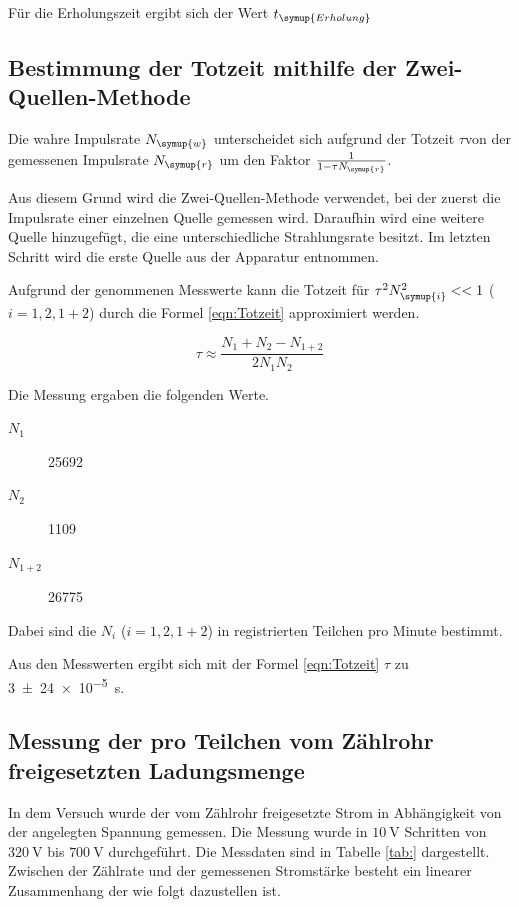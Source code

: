 Für die Erholungszeit ergibt sich der Wert $t_{\symup{Erholung}}$

\subsection{Bestimmung der Totzeit mithilfe der Zwei-Quellen-Methode}

Die wahre Impulsrate $N_{\symup{w}}$ unterscheidet sich aufgrund der Totzeit $\tau $von der
gemessenen Impulsrate $N_{\symup{r}}$ um den Faktor $\frac{1}{1-\tau N_{\symup{r}}}$.

Aus diesem Grund wird die Zwei-Quellen-Methode verwendet, bei der
zuerst die Impulsrate einer einzelnen Quelle gemessen wird.
Daraufhin wird eine weitere Quelle hinzugefügt, die eine unterschiedliche
Strahlungsrate besitzt. Im letzten Schritt wird die erste Quelle aus der
Apparatur entnommen.

Aufgrund der genommenen Messwerte kann die Totzeit für $\tau^2N_{\symup{i}}^2 << 1$
($i = 1, 2, 1+2$) durch die Formel \ref{eqn:Totzeit} approximiert werden.

\begin{equation}
  \label{eqn:Totzeit}
  \tau \approx \frac{N_1 + N_2 - N_{1+2}}{2N_1N_2}
\end{equation}

Die Messung ergaben die folgenden Werte.

\begin{description}
  \item[$N_1$] 25692
  \item[$N_2$] 1109
  \item[$N_{1+2}$] 26775
\end{description}

Dabei sind die $N_i$ ($i = 1, 2, 1+2$) in registrierten Teilchen pro Minute bestimmt.

Aus den Messwerten ergibt sich mit der Formel \ref{eqn:Totzeit}
$\tau$ zu \SI{3(24)e-5}{\second}.

\subsection{Messung der pro Teilchen vom Zählrohr freigesetzten Ladungsmenge}

In dem Versuch wurde der vom Zählrohr freigesetzte Strom
in Abhängigkeit von der angelegten Spannung gemessen.
Die Messung wurde in $\SI{10}{\volt}$ Schritten von
$\SI{320}{\volt}$ bis $\SI{700}{\volt}$ durchgeführt.
Die Messdaten sind in Tabelle \ref{tab:} dargestellt.
Zwischen der Zählrate und der gemessenen Stromstärke besteht ein
linearer Zusammenhang der wie folgt dazustellen ist.

